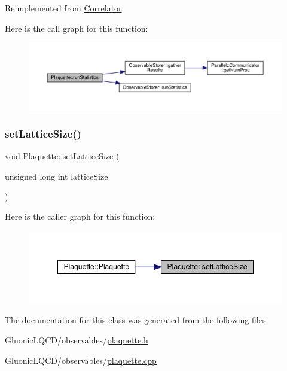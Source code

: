 Reimplemented from \mbox{\hyperlink{class_correlator_a35197b1d12b62ef30b79c0138a26456e}{Correlator}}.

Here is the call graph for this function\+:\nopagebreak
\begin{figure}[H]
\begin{center}
\leavevmode
\includegraphics[width=350pt]{class_plaquette_aa54bf1807d9b192048026f94d585fa4f_cgraph}
\end{center}
\end{figure}
\mbox{\label{class_plaquette_a011e1ca450fb40273ec8efa6d094c279}} 
\subsubsection{\texorpdfstring{setLatticeSize()}{setLatticeSize()}}
{\footnotesize\ttfamily void Plaquette\+::set\+Lattice\+Size (\begin{DoxyParamCaption}\item[{unsigned long int}]{lattice\+Size }\end{DoxyParamCaption})}

Here is the caller graph for this function\+:\nopagebreak
\begin{figure}[H]
\begin{center}
\leavevmode
\includegraphics[width=348pt]{class_plaquette_a011e1ca450fb40273ec8efa6d094c279_icgraph}
\end{center}
\end{figure}


The documentation for this class was generated from the following files\+:\begin{DoxyCompactItemize}
\item 
Gluonic\+L\+Q\+C\+D/observables/\mbox{\hyperlink{plaquette_8h}{plaquette.\+h}}\item 
Gluonic\+L\+Q\+C\+D/observables/\mbox{\hyperlink{plaquette_8cpp}{plaquette.\+cpp}}\end{DoxyCompactItemize}
